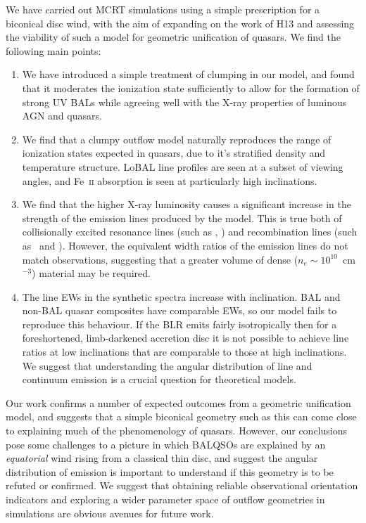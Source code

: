 \documentclass[useAMS,usenatbib]{mn2e_x}
\begin{document}
We have carried out MCRT simulations using a simple
prescription for a biconical disc wind, with
the aim of expanding on the work of H13 and assessing 
the viability of such a model for geometric unification of quasars.
We find the following main points:
\begin{enumerate}
\item We have introduced a simple treatment 
of clumping in our model, and found that it moderates the ionization state
sufficiently to allow for the 
formation of strong UV BALs while agreeing well with the X-ray
properties of luminous AGN and quasars. 
\smallskip
\item We find that a clumpy outflow model naturally 
reproduces the range of ionization states
expected in quasars, due to it's stratified density
and temperature structure. 
LoBAL line profiles are seen at a subset of viewing angles, and Fe~\textsc{ii}
absorption is seen at particularly high inclinations. 
\smallskip
\item We find that the higher X-ray luminosity 
causes a significant 
increase in the strength of the  emission
lines produced by the model. This is true both
of collisionally excited resonance lines (such as \civ, \nv)
and recombination lines (such as \la\ and \heiiline).
However, the equivalent width ratios of the emission lines do not match
observations, suggesting that a greater volume of dense ($n_e\sim10^{10}$~cm$^{-3}$)
material may be required.
\smallskip
\item The line EWs in the synthetic spectra increase with inclination.
BAL and non-BAL quasar composites have comparable EWs, so our model
fails to reproduce this behaviour.
 If the BLR emits fairly isotropically then for a 
foreshortened, limb-darkened accretion disc 
it is not possible to achieve line ratios at low inclinations 
that are comparable to those at high inclinations. 
We suggest that understanding the angular distribution of 
line and continuum emission is a crucial question for theoretical models.
\end{enumerate}
Our work confirms a number of expected outcomes from a geometric unification 
model, and suggests that a simple biconical geometry such as this can come close to 
explaining much of the  phenomenology of quasars. However, our conclusions pose 
some challenges to a picture in which BALQSOs are
explained by an {\em equatorial} wind rising from a classical thin disc, and suggest 
the angular distribution of emission is important to understand if this 
geometry is to be refuted or confirmed. We suggest that obtaining reliable 
observational orientation indicators and 
exploring a wider parameter space of outflow geometries in simulations
are obvious avenues for future work.
\end{document}
